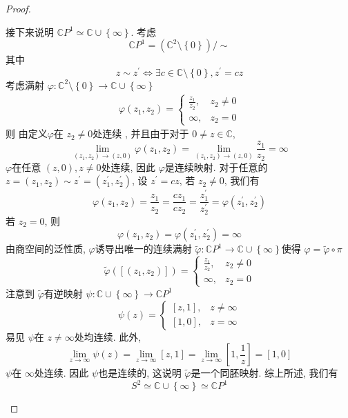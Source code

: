 \documentclass[../main.tex]{subfiles}
\begin{document}
\begin{proof}
\begin{enumerate}
 接下来说明 \(  \mathbb{C} P^{1}\simeq \mathbb{C} \cup \left\{ \infty \right\}  \). 考虑 \[
 \mathbb{C} P^{1}=\left( \mathbb{C} ^{2}\setminus \left\{ 0 \right\}  \right) / \sim 
 \] 其中 \[
 z\sim z^{\prime} \iff  \exists c \in \mathbb{C}\setminus \left\{ 0 \right\}, z^{\prime} = cz
 \]考虑满射 \(   \varphi :\mathbb{C} ^{2}\setminus \left\{ 0 \right\}\to \mathbb{C} \cup \left\{ \infty \right\}  \) \[
 \begin{aligned}
  \varphi \left( z_1,z_2 \right)= \begin{cases} \frac{z_1 }{z_2 },&z_2\neq 0\\ 
   \infty,& z_2= 0  \end{cases}   
 \end{aligned}
 \] 则 由定义\(   \varphi   \)在 \(  z_2\neq 0  \)处连续  , 并且由于对于 \(  0\neq z\in \mathbb{C}   \),   \[
 \lim_{\left( z_1,z_2 \right)\to \left( z,0 \right)  } \varphi \left( z_1,z_2 \right)= \lim_{\left( z_1,z_2 \right)\to \left( z,0 \right)  }\frac{z_1 }{z_2 }= \infty  
 \] \(   \varphi   \)在任意 \(  \left( z,0 \right) , z\neq 0   \)处连续, 因此 \(   \varphi   \)是连续映射.    对于任意的 \(  z= \left( z_1,z_2 \right)\sim z^{\prime} = \left( z_1^{\prime} ,z_2^{\prime}  \right)    \), 设 \(  z^{\prime} = cz  \), 若 \(  z_2\neq 0  \),   我们有 \[
  \varphi \left( z_1,z_2 \right) = \frac{z_1 }{z_2 }= \frac{cz_1 }{cz_2 }= \frac{z_1^{\prime}  }{z_2^{\prime}  }=  \varphi \left( z_1^{\prime} ,z_2^{\prime}  \right)    
 \]若 \(  z_2= 0  \), 则 \[
  \varphi \left( z_1,z_2 \right)=  \varphi \left( z_1^{\prime} ,z_2^{\prime}  \right)= \infty  
 \]由商空间的泛性质,  \(   \varphi   \)诱导出唯一的连续满射 \(   \tilde{\varphi} :\mathbb{C} P^{1}\to \mathbb{C} \cup \left\{ \infty \right\}  \)使得 \(   \varphi =  \tilde{\varphi} \circ \pi  \)   \[
  \tilde{\varphi} \left( [\left( z_1,z_2 \right) ] \right)= \begin{cases} \frac{z_1 }{z_2 }  ,& z_2\neq 0\\ 
   \infty,&z_2= 0 \end{cases} 
 \]   注意到 \(   \tilde{\varphi}   \)有逆映射 \(  \psi :\mathbb{C} \cup \left\{ \infty \right\}\to \mathbb{C} P^{1}  \) \[
 \psi \left( z \right)= \begin{cases} \left[ z,1 \right],& z\neq \infty\\ 
  \left[ 1,0 \right],&z = \infty   \end{cases}  
 \] 易见 \(  \psi   \)在 \(  z\neq \infty  \)处均连续. 此外,  \[
 \lim_{z\to \infty}\psi \left( z \right)= \lim_{z\to \infty}\left[ z,1 \right]= \lim_{z\to \infty}\left[ 1, \frac{1 }{z }  \right]= \left[ 1,0 \right]    
 \] \(  \psi   \)在 \(  \infty  \)处连续. 因此 \(  \psi   \)也是连续的, 这说明 \(   \tilde{\varphi}   \)是一个同胚映射. 综上所述, 我们有 \[
 S^{2}\simeq \mathbb{C} \cup \left\{ \infty \right\}\simeq \mathbb{C} P^{1}
 \]      

   \end{enumerate}
   

\end{proof}
\end{document}
